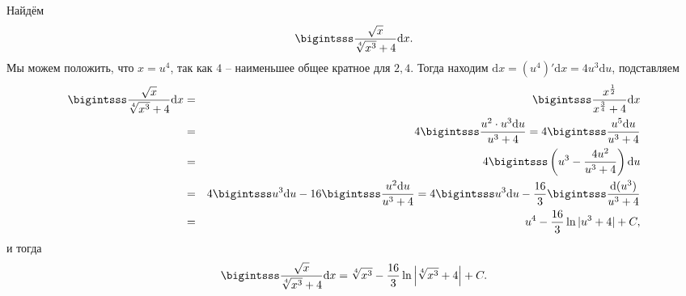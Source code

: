 \begin{example}
    Найдём 
    \[
     \bigintsss \frac{\sqrt{x}}{\sqrt[4]{x^3} +4} \mathrm{d}x.
    \]
Мы можем положить, что $x = u^4$, так как $4$ -- наименьшее общее кратное для $2,4$. Тогда находим $\mathrm{d}x = (u^4)'\mathrm{d}x = 4u^3 \mathrm{d}u$, подставляем
\begin{eqnarray*}
    \bigintsss \frac{\sqrt{x}}{\sqrt[4]{x^3} +4} \mathrm{d}x &=& \bigintsss \frac{x^{\frac{1}{2}}}{x^{\frac{3}{4}}+4} \mathrm{d}x \\
    &=& 4 \bigintsss \frac{u^2 \cdot u^3 \mathrm{d}u}{u^3+4} = 4 \bigintsss \frac{u^5\mathrm{d}u}{u^3+4} \\
    &=& 4 \bigintsss \left(u^3 - \frac{4u^2}{u^3+4} \right)\mathrm{d}u \\
    &=& 4\bigintsss u^3 \mathrm{d}u - 16 \bigintsss\frac{u^2 \mathrm{d}u}{u^3 +4} = 4\bigintsss u^3 \mathrm{d}u - \frac{16}{3} \bigintsss\frac{\mathrm{d}(u^3)}{u^3 +4} \\
    &=& u^4 - \frac{16}{3} \ln |u^3 + 4| +C,
\end{eqnarray*}
и тогда
 \[
     \bigintsss \frac{\sqrt{x}}{\sqrt[4]{x^3} +4} \mathrm{d}x = \sqrt[4]{x^3} - \frac{16}{3} \ln \left| \sqrt[4]{x^3} + 4 \right| + C.
    \]
\end{example}




